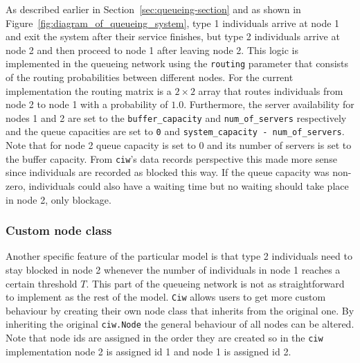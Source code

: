 As described earlier in Section~\ref{sec:queueing-section} and as shown in
Figure~\ref{fig:diagram_of_queueing_system}, type 1 individuals arrive at
node 1 and exit the system after their service finishes, but type 2 individuals
arrive at node 2 and then proceed to node 1 after leaving node 2.
This logic is implemented in the queueing network using the
\lstinline[style=pystyle]{routing} parameter that consists of the routing
probabilities between different nodes.
For the current implementation the routing matrix is a \(2 \times 2\) array
that routes individuals from node 2 to node 1 with a probability of
\(1.0\).
Furthermore, the server availability for nodes 1 and 2 are set to
the \lstinline[style=pystyle]{buffer_capacity} and
\lstinline[style=pystyle]{num_of_servers} respectively and the queue capacities
are set to \lstinline[style=pystyle]{0} and
\lstinline[style=pystyle]{system_capacity - num_of_servers}.
Note that for node 2 queue capacity is set to 0 and its
number of servers is set to the buffer capacity.
From \lstinline[style=pystyle]{ciw}'s data records perspective this made more
sense since individuals are recorded as blocked this way.
If the queue capacity was non-zero, individuals could also have a waiting time
but no waiting should take place in node 2, only blockage.


\subsubsection{Custom node class}
Another specific feature of the particular model is that type 2 individuals
need to stay blocked in node 2 whenever the number of individuals in node 1
reaches a certain threshold \(T\).
This part of the queueing network is not as straightforward to implement as the
rest of the model.
\lstinline[style=pystyle]{Ciw} allows users to get more custom behaviour by
creating their own node class that inherits from the original one.
By inheriting the original \lstinline[style=pystyle]{ciw.Node} the general
behaviour of all nodes can be altered.
Note that node ids are assigned in the order they are created so in the
\lstinline[style=pystyle]{ciw} implementation node 2 is assigned id 1 and node 1
is assigned id 2.



